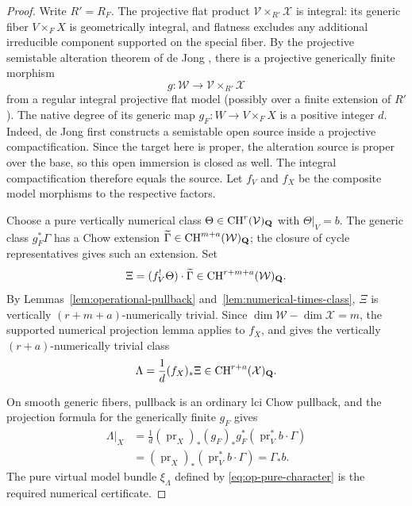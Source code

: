 \begin{proof}
Write $R'=R_F$.  The projective flat product
$\mathcal V\times_{R'}\mathcal X$ is integral: its generic
fiber $V\times_F X$ is geometrically integral, and flatness
excludes any additional irreducible component supported on the
special fiber.  By the projective semistable alteration theorem
of de Jong \cite[Theorem~6.5]{deJong}, there is a projective
generically finite morphism
\[
 g:\mathcal W\longrightarrow
                  \mathcal V\times_{R'}\mathcal X
\]
from a regular integral projective flat model (possibly over a
finite extension of $R'$).  The native degree of its generic
map $g_F:W\to V\times_F X$ is a positive integer $d$.
Indeed, de Jong first constructs a semistable open source inside
a projective compactification.  Since the target here is proper,
the alteration source is proper over the base, so this open
immersion is closed as well.  The integral compactification
therefore equals the source.
Let $f_V$ and $f_X$ be the composite model morphisms to the
respective factors.

Choose a pure vertically numerical class
$\Theta\in\operatorname{CH}^r(\mathcal V)_{\mathbf Q}$ with
$\Theta|_V=b$.  The generic class $g_F^*\Gamma$ has a Chow
extension $\widetilde\Gamma\in\operatorname{CH}^{m+a}(\mathcal W)_{\mathbf Q}$;
the closure of cycle representatives gives such an extension.
Set
\[
 \Xi=(f_V^!\Theta)\cdot\widetilde\Gamma
      \in\operatorname{CH}^{r+m+a}(\mathcal W)_{\mathbf Q}.
\]
By Lemmas~\ref{lem:operational-pullback}
and~\ref{lem:numerical-times-class},
$\Xi$ is vertically $(r+m+a)$-numerically trivial.  Since
$\dim\mathcal W-\dim\mathcal X=m$, the supported numerical
projection lemma applies to $f_X$, and gives the vertically
$(r+a)$-numerically trivial class
\[
          \Lambda=\frac1d(f_X)_*\Xi
                     \in\operatorname{CH}^{r+a}(\mathcal X)_{\mathbf Q}.
\]

On smooth generic fibers, pullback is an ordinary lci Chow
pullback, and the projection formula for the generically finite
$g_F$ gives
\[
 \begin{aligned}
 \Lambda|_X
  &=\frac1d(\operatorname{pr}_X)_*
       (g_F)_*g_F^*(\operatorname{pr}_V^*b\cdot\Gamma)\\
  &=(\operatorname{pr}_X)_*
                      (\operatorname{pr}_V^*b\cdot\Gamma)
   =\Gamma_*b.
 \end{aligned}
\]
The pure virtual model bundle $\xi_\Lambda$ defined by
\eqref{eq:op-pure-character} is the required numerical
certificate.
\end{proof}

